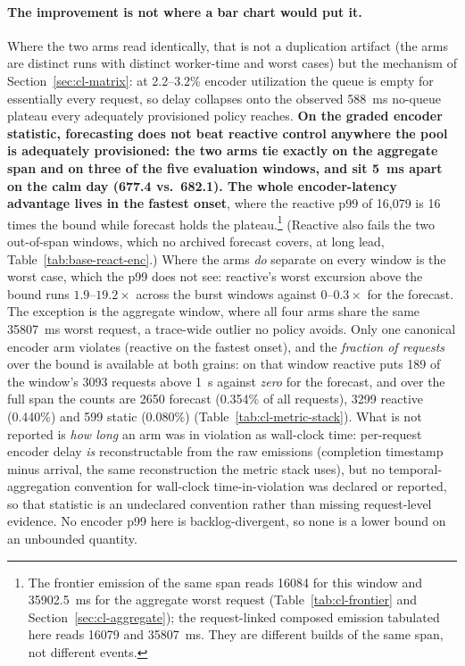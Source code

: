 \paragraph{The improvement is not where a bar chart would put it.} Where the
two arms read identically, that is
not a duplication artifact (the
arms are distinct runs with distinct worker-time and worst cases) but the
mechanism of Section~\ref{sec:cl-matrix}: at 2.2--3.2\% encoder utilization the
queue is empty for essentially every request, so delay collapses onto the
observed \SI{588}{\milli\second} no-queue plateau every adequately provisioned
policy reaches. \textbf{On the graded encoder statistic, forecasting does not
beat reactive control anywhere the pool is adequately provisioned: the two
arms tie exactly on the aggregate span and on three of the five evaluation
windows, and sit \SI{5}{\milli\second} apart on the calm day
(677.4 vs.\ 682.1). The whole encoder-latency advantage lives in the fastest
onset}, where the reactive p99 of 16{,}079 is 16 times the
bound while forecast holds the plateau.\footnote{The frontier emission of the
same span reads \num{16084} for this window and \SI{35902.5}{\milli\second}
for the aggregate worst request (Table~\ref{tab:cl-frontier} and
Section~\ref{sec:cl-aggregate}); the request-linked composed emission
tabulated here reads \num{16079} and \SI{35807}{\milli\second}. They are
different builds of the same span, not different events.} (Reactive also fails the two
out-of-span windows, which no archived forecast covers, at long lead,
Table~\ref{tab:base-react-enc}.) Where the arms \emph{do} separate on every window is
the worst case, which the p99 does not see: reactive's worst excursion above
the bound runs $1.9$--$19.2\times$ across the burst windows against
$0$--$0.3\times$ for the forecast. The exception is the aggregate window,
where all four arms share the same \SI{35807}{\milli\second} worst request, a
trace-wide outlier no policy avoids. Only one canonical encoder arm violates
(reactive on the fastest onset), and the \emph{fraction of requests} over the
bound is available at both grains: on that window reactive puts
\num{189} of the window's \num{3093} requests above \SI{1}{\second} against
\emph{zero} for the forecast, and over the full span the counts are
\num{2650} forecast (0.354\% of all requests), \num{3299} reactive (0.440\%)
and \num{599} static (0.080\%) (Table~\ref{tab:cl-metric-stack}). What is
not reported is \emph{how long} an arm was in violation as wall-clock
time: per-request encoder delay \emph{is} reconstructable from the raw
emissions (completion timestamp minus arrival, the same reconstruction the
metric stack uses), but no temporal-aggregation convention for wall-clock
time-in-violation was declared or reported, so that statistic is an
undeclared convention rather than missing request-level evidence. No encoder p99 here is
backlog-divergent, so none is a lower bound on an unbounded quantity.

